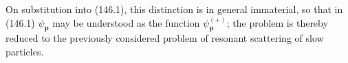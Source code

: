 On substitution into (146.1), this distinction is in general immaterial, so that in (146.1) $\psi_{\mathbf p}$ may be understood as the function $\psi_{\mathbf p}^{(+)}$; the problem is thereby reduced to the previously considered problem of resonant scattering of slow particles.
